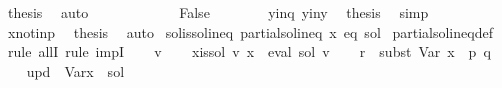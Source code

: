 \begin{isabellebody}
\ {\isacharquery}{\kern0pt}thesis\ \isamarkupfalse%
\ auto\isanewline
\ \ \ \ \isamarkupfalse%
\isanewline
\ \ \ \ \ \ \isamarkupfalse%
\ False\isanewline
\ \ \ \ \ \ \isamarkupfalse%
\ y{\isacharprime}{\kern0pt}{\isacharunderscore}{\kern0pt}in{\isacharunderscore}{\kern0pt}q\ y{\isacharunderscore}{\kern0pt}in{\isacharunderscore}{\kern0pt}y{\isacharprime}{\kern0pt}\ \isamarkupfalse%
\ {\isacharquery}{\kern0pt}thesis\ \isamarkupfalse%
\ simp\isanewline
\ \ \ \ \isamarkupfalse%
\isanewline
\ \ \isamarkupfalse%
\isanewline
\ \ \isamarkupfalse%
\ x{\isacharunderscore}{\kern0pt}not{\isacharunderscore}{\kern0pt}in{\isacharunderscore}{\kern0pt}p\ \isamarkupfalse%
\ {\isacharquery}{\kern0pt}thesis\ \isamarkupfalse%
\ auto\isanewline
{}\isamarkupfalse%
%
\endisatagproof
{\isafoldproof}%
%
\isadelimproof
\isanewline
%
\endisadelimproof
\isanewline
{}\isamarkupfalse%
\ sol{\isacharunderscore}{\kern0pt}is{\isacharunderscore}{\kern0pt}sol{\isacharunderscore}{\kern0pt}ineq{\isacharcolon}{\kern0pt}\ {\isachardoublequoteopen}partial{\isacharunderscore}{\kern0pt}sol{\isacharunderscore}{\kern0pt}ineq\ x\ eq\ sol{\isachardoublequoteclose}\isanewline
%
\isadelimproof
%
\endisadelimproof
%
\isatagproof
{}\isamarkupfalse%
\ partial{\isacharunderscore}{\kern0pt}sol{\isacharunderscore}{\kern0pt}ineq{\isacharunderscore}{\kern0pt}def\ \isamarkupfalse%
\ {\isacharparenleft}{\kern0pt}rule\ allI{\isacharcomma}{\kern0pt}\ rule\ impI{\isacharparenright}{\kern0pt}\isanewline
\ \ \isamarkupfalse%
\ v\isanewline
\ \ \isamarkupfalse%
\ x{\isacharunderscore}{\kern0pt}is{\isacharunderscore}{\kern0pt}sol{\isacharcolon}{\kern0pt}\ {\isachardoublequoteopen}v\ x\ {\isacharequal}{\kern0pt}\ eval\ sol\ v{\isachardoublequoteclose}\isanewline
\ \ \isamarkupfalse%
\ {\isacharquery}{\kern0pt}r\ {\isacharequal}{\kern0pt}\ {\isachardoublequoteopen}subst\ {\isacharparenleft}{\kern0pt}Var\ {\isacharparenleft}{\kern0pt}x\ {\isacharcolon}{\kern0pt}{\isacharequal}{\kern0pt}\ p{\isacharparenright}{\kern0pt}{\isacharparenright}{\kern0pt}\ q{\isachardoublequoteclose}\isanewline
\ \ \isamarkupfalse%
\ {\isacharquery}{\kern0pt}upd\ {\isacharequal}{\kern0pt}\ {\isachardoublequoteopen}Var{\isacharparenleft}{\kern0pt}x\ {\isacharcolon}{\kern0pt}{\isacharequal}{\kern0pt}\ sol{\isacharparenright}{\kern0pt}{\isachardoublequoteclose}\isanewline

\end{isabellebody}
